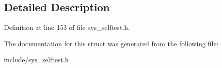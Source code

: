 \subsection{Detailed Description}


Definition at line 153 of file sys\+\_\+selftest.\+h.



The documentation for this struct was generated from the following file\+:\begin{DoxyCompactItemize}
\item 
include/\mbox{\hyperlink{sys__selftest_8h}{sys\+\_\+selftest.\+h}}\end{DoxyCompactItemize}
